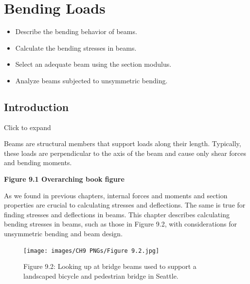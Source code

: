 \documentclass[
  letterpaper,
  DIV=11,
  numbers=noendperiod]{scrreprt}
\providecommand{\tightlist}{%
  \setlength{\itemsep}{0pt}\setlength{\parskip}{0pt}}\usepackage{longtable,booktabs,array}
\begin{document}

\chapter{Bending Loads}\label{sec-bending-loads}

\begin{tcolorbox}[enhanced jigsaw, breakable, opacityback=0, toptitle=1mm, left=2mm, colback=white, opacitybacktitle=0.6, colframe=quarto-callout-note-color-frame, titlerule=0mm, arc=.35mm, leftrule=.75mm, bottomtitle=1mm, colbacktitle=quarto-callout-note-color!10!white, rightrule=.15mm, title={Learning Objectives}, bottomrule=.15mm, toprule=.15mm, coltitle=black]

\begin{itemize}
\tightlist
\item
  Describe the bending behavior of beams.
\item
  Calculate the bending stresses in beams.
\item
  Select an adequate beam using the section modulus.
\item
  Analyze beams subjected to unsymmetric bending.
\end{itemize}

\end{tcolorbox}

\section*{Introduction}\label{introduction-9}


Click to expand

Beams are structural members that support loads along their length.
Typically, these loads are perpendicular to the axis of the beam and
cause only shear forces and bending moments.

\textbf{Figure 9.1 Overarching book figure} \,

As we found in previous chapters, internal forces and moments and
section properties are crucial to calculating stresses and deflections.
The same is true for finding stresses and deflections in beams. This
chapter describes calculating bending stresses in beams, such as those
in Figure 9.2, with considerations for unsymmetric bending and beam
design.

\begin{figure}[H]

{\centering \texttt{[image: images/CH9 PNGs/Figure 9.2.jpg]}

}

\caption{Figure 9.2: Looking up at bridge beams used to support a
landscaped bicycle and pedestrian bridge in Seattle.}

\end{figure}%
\end{document}
